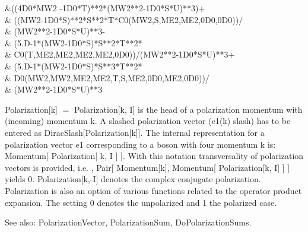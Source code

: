 {  \multsp \multsp \multsp \multsp \multsp \&\multsp \multsp \multsp ((4D0*MW2\multsp
    -\multsp 1D0*T)**2*(MW2**2\multsp -\multsp 1D0*S*U)**3)\multsp +\multsp  \\
  \multsp \multsp \multsp \multsp \multsp \&\multsp
    \multsp ((MW2\multsp -\multsp 1D0*S)**2*S**2*T*C0(MW2,S,ME2,ME2,0D0,0D0))/ \\
  \multsp \multsp \multsp \multsp \multsp \&\multsp
    \multsp \multsp (MW2**2\multsp -\multsp 1D0*S*U)**3\multsp -\multsp  \\
  \multsp \multsp \multsp \multsp \multsp \&\multsp \multsp
    (5.D-1*(MW2\multsp -\multsp 1D0*S)*S**2*T**2* \\
  \multsp \multsp \multsp \multsp \multsp \&\multsp \multsp \multsp \multsp \multsp
    C0(T,ME2,ME2,ME2,ME2,0D0))/(MW2**2\multsp -\multsp 1D0*S*U)**3\multsp +\multsp  \\
  \multsp \multsp \multsp \multsp \multsp \&\multsp
    \multsp (5.D-1*(MW2\multsp -\multsp 1D0*S)*S**3*T**2* \\
  \multsp \multsp \multsp \multsp \multsp \&\multsp \multsp \multsp \multsp
    \multsp D0(MW2,MW2,ME2,ME2,T,S,ME2,0D0,ME2,0D0))/ \\
  \multsp \multsp \multsp \multsp \multsp \&\multsp \multsp \multsp
    (MW2**2\multsp -\multsp 1D0*S*U)**3 \\
  \multsp \multsp \multsp \multsp \multsp \multsp \multsp \multsp \multsp \multsp \multsp
    \multsp \multsp \multsp \multsp \multsp \multsp \multsp
}



Polarization[k] \(=\) Polarization[k, I] is the head of a polarization momentum with (incoming) momentum k. A slashed polarization vector
  (e1(k) slash) has to be entered as DiracSlash[Polarization[k]]. The internal representation for a polarization vector e1 corresponding
  to a boson with four momentum k is: Momentum[ Polarization[ k, I ] ]. With this notation transversality of polarization vectors is
  provided, i.e. , Pair[ Momentum[k], Momentum[ Polarization[k, I] ] ] yields 0. Polarization[k,-I] denotes the complex conjugate
  polarization. Polarization is also an option of various functions related to the operator product expansion. The setting 0 denotes the
  unpolarized and 1 the polarized case.

See also:  PolarizationVector, PolarizationSum, DoPolarizationSums.


